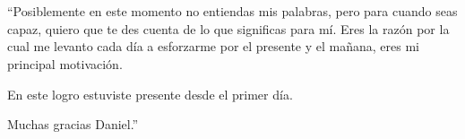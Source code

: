 \thispagestyle{empty}
\chapter*{\phantom{Declaración}}
``Posiblemente en este momento no entiendas mis palabras, pero para cuando seas capaz, quiero que te des cuenta de lo que significas para mí. Eres la razón por la cual me levanto cada día a esforzarme por el presente y el mañana, eres mi principal motivación.

En este logro estuviste presente desde el primer día.

Muchas gracias Daniel.''
    \\
    \begin{center}
    \end{center}
\clearpage
